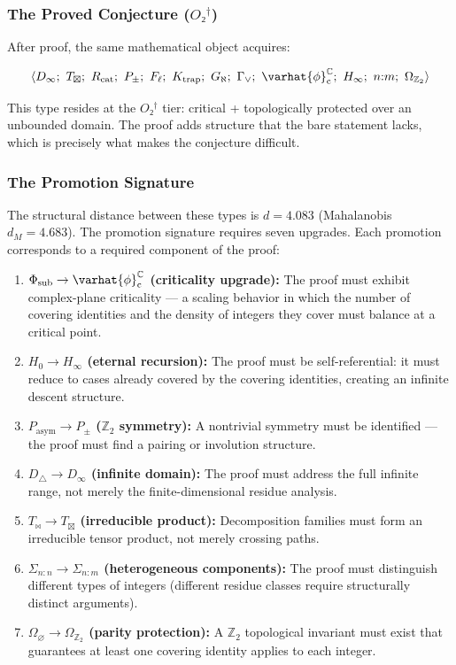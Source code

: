 \documentclass[12pt,a4paper]{article}
\begin{document}
\subsubsection{The Proved Conjecture ($O₂^\dagger$)}

After proof, the same mathematical object acquires:

\[\langle D_{\infty};\ T_{\boxtimes};\ R_\text{cat};\ P_{\pm};\ F_{\ell};\ K_\text{trap};\ G_{\aleph};\ \Gamma_{\vee};\ \varhat{\phi}^{\mathbb{C}}_\text{c};\ H_{\infty};\ n{:}m;\ \Omega_{\mathbb{Z}_2} \rangle\]

This type resides at the $O₂^\dagger$ tier: critical + topologically protected over an unbounded domain. The proof adds structure that the bare statement lacks, which is precisely what makes the conjecture difficult.

\subsubsection{The Promotion Signature}

The structural distance between these types is $d = 4.083$ (Mahalanobis $d_M = 4.683$). The promotion signature requires seven upgrades. Each promotion corresponds to a required component of the proof:

\begin{enumerate}
    \item \textbf{$\Phi_\text{sub} \to \varhat{\phi}^{\mathbb{C}}_\text{c}$ (criticality upgrade):} The proof must exhibit complex-plane criticality --- a scaling behavior in which the number of covering identities and the density of integers they cover must balance at a critical point.
    \item \textbf{$H_0 \to H_{\infty}$ (eternal recursion):} The proof must be self-referential: it must reduce to cases already covered by the covering identities, creating an infinite descent structure.
    \item \textbf{$P_\text{asym} \to P_{\pm}$ ($\mathbb{Z}_2$ symmetry):} A nontrivial symmetry must be identified --- the proof must find a pairing or involution structure.
    \item \textbf{$D_{\triangle} \to D_{\infty}$ (infinite domain):} The proof must address the full infinite range, not merely the finite-dimensional residue analysis.
    \item \textbf{$T_{\bowtie} \to T_{\boxtimes}$ (irreducible product):} Decomposition families must form an irreducible tensor product, not merely crossing paths.
    \item \textbf{$\Sigma_{n{:}n} \to \Sigma_{n{:}m}$ (heterogeneous components):} The proof must distinguish different types of integers (different residue classes require structurally distinct arguments).
    \item \textbf{$\Omega_{\varnothing} \to \Omega_{\mathbb{Z}_2}$ (parity protection):} A $\mathbb{Z}_2$ topological invariant must exist that guarantees at least one covering identity applies to each integer.
\end{enumerate}
\end{document}
